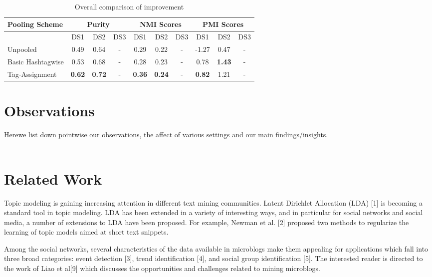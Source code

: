 \documentclass[10pt,a5paper,twoside]{article}
\begin{document}
\begin{table}[!h]
\setcounter{table}{13}
\centering
	\begin{tabular}{|l|ccc|ccc|ccc|}
	\hline
	Pooling Scheme  & \multicolumn {3}{c}{Purity} & \multicolumn {3}{c}{NMI Scores} & \multicolumn {3}{c}{PMI Scores}\\
	\hline
	 & DS1 & DS2 & DS3 &  DS1 & DS2 & DS3 &  DS1 & DS2 & DS3\\
	\hline
	Unpooled & 0.49 & 0.64 & - & 0.29 & 0.22 & - & -1.27 & 0.47 & - \\
	\hline
	Basic Hashtagwise & 0.53 & 0.68 & - & 0.28 & 0.23 & - & 0.78 & \textbf{1.43} & - \\
	\hline
	Tag-Assignment & \textbf{0.62} & \textbf{0.72} & - & \textbf{0.36} & \textbf{0.24} & - & \textbf{0.82} & 1.21 & - \\
	\hline
	\end{tabular}
\caption{Overall comparison of improvement}\label{Table}
\end{table}


\section{Observations}
Herewe list down pointwise our observations, the affect of various settings and our main findings/insights.\\\\


\section{Related Work}
Topic modeling is gaining increasing attention in different text mining communities. Latent Dirichlet Allocation (LDA) [1] is becoming a standard tool in topic modeling. LDA has been extended in a variety of interesting ways, and in particular for social networks and social media, a number of extensions to LDA have been proposed. For example, Newman et al. [2] proposed two methods to regularize the learning of topic models aimed at short text snippets.

Among the social networks, several characteristics of the data available in microblogs make them appealing for applications which fall into three broad categories: event detection [3], trend identification [4], and social group identification [5]. The interested reader is directed to the work of Liao et al[9] which discusses the opportunities and challenges related to mining microblogs.
\\
\end{document}
